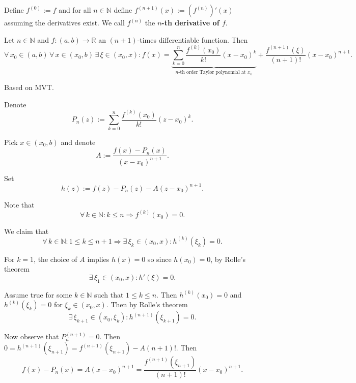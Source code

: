 \documentclass{notes}
\begin{document}
  \begin{defn}
    Define $f^{(0)} := f$ and for all $n \in \mathbb N$ define $f^{(n + 1)}(x) := \left ( f^{(n)} \right )'(x)$ assuming the derivatives exist.
    We call $f^{(n)}$ the {\boldmath \bfseries $n$-th derivative of $f$}.
  \end{defn}
  
  \begin{thm}
    Let $n \in \mathbb N$ and $f \colon (a, b) \to \mathbb R$ an $(n + 1)$-times differentiable function.
    Then 
    \[
      \forall \, x_0 \in (a, b) \, \forall \, x \in (x_0, b) \, \exists \, \xi \in (x_0, x): f(x) = \underbrace{\sum_{k = 0}^n \frac{f^{(k)}(x_0)}{k!} (x - x_0)^k}_{\text{$n$-th order Taylor polynomial at $x_0$}} {} + \frac{f^{(n + 1)}(\xi)}{(n + 1)!} (x - x_0)^{n + 1}.
    \]
  \end{thm}
  
  \begin{prf}
    Based on MVT.
    
    Denote
    \begin{equation}
      P_n(z) := \sum_{k = 0}^n \frac{f^{(k)}(x_0)}{k!} (z - x_0)^k.
    \end{equation}
    

    Pick $x \in (x_0, b)$ and denote 
    \begin{equation}
      A := \frac{f(x) - P_n(x)}{(x - x_0)^{n + 1}}.
    \end{equation}
    
    Set 
    \begin{equation}
      h(z) := f(z) - P_n(z) - A(z - x_0)^{n + 1}.
    \end{equation}
    
    Note that 
    \[
      \forall \, k \in \mathbb N: k \leq n \Rightarrow f^{(k)}(x_0) = 0.
    \]
    
    We claim that 
    \[
      \forall \, k \in \mathbb N: 1 \leq k \leq n + 1 \Rightarrow \exists \, \xi_k \in (x_0, x): h^{(k)}(\xi_k) = 0.
    \]
    
    For $k = 1$, the choice of $A$ implies $h(x) = 0$ so since $h(x_0) = 0$, by Rolle's theorem
    \[
      \exists \, \xi_1 \in (x_0, x): h'(\xi) = 0.
    \]
    
    Assume true for some $k \in \mathbb N$ such that $1 \leq k \leq n$.
    Then $h^{(k)}(x_0) = 0$ and $h^{(k)}(\xi_k) = 0$ for $\xi_k \in (x_0, x)$.
    Then by Rolle's theorem 
    \[
      \exists \, \xi_{k + 1} \in (x_0, \xi_k): h^{(n + 1)}(\xi_{k + 1}) = 0.
    \]
    
    Now observe that $P_n^{(n + 1)} = 0$.
    Then $0 = h^{(n + 1)}(\xi_{n + 1}) = f^{(n + 1)}(\xi_{n + 1}) - A (n + 1)!$.
    Then 
    \[
      f(x) - P_n(x) = A(x - x_0)^{n + 1} = \frac{f^{(n + 1)}(\xi_{n + 1})}{(n + 1)!} (x - x_0)^{n + 1}.
    \]
  \end{prf}
  
\end{document}
